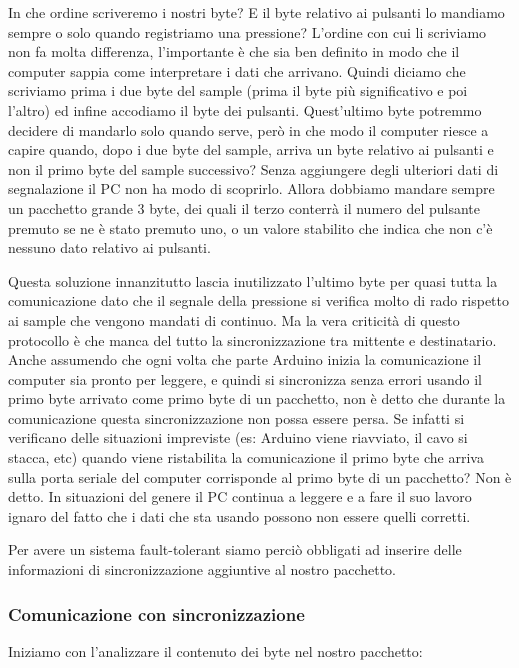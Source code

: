 \documentclass[a4paper,11pt]{article}
\begin{document}
In che ordine scriveremo i nostri byte? E il byte relativo ai pulsanti lo mandiamo sempre o solo quando registriamo una pressione? L'ordine con cui li scriviamo non fa molta differenza, l'importante è che sia ben definito in modo che il computer sappia come interpretare i dati che arrivano. Quindi diciamo che scriviamo prima i due byte del sample (prima il byte più significativo e poi l'altro) ed infine accodiamo il byte dei pulsanti.
Quest'ultimo byte potremmo decidere di mandarlo solo quando serve, però in che modo il computer riesce a capire quando, dopo i due byte del sample, arriva un byte relativo ai pulsanti e non il primo byte del sample successivo? Senza aggiungere degli ulteriori dati di segnalazione il PC non ha modo di scoprirlo. Allora dobbiamo mandare sempre un pacchetto grande 3 byte, dei quali il terzo conterrà il numero del pulsante premuto se ne è stato premuto uno, o un valore stabilito che indica che non c'è nessuno dato relativo ai pulsanti.
\vspace{0.2in}

Questa soluzione innanzitutto lascia inutilizzato l'ultimo byte per quasi tutta la comunicazione dato che il segnale della pressione si verifica molto di rado rispetto ai sample che vengono mandati di continuo. Ma la vera criticità di questo protocollo è che manca del tutto la sincronizzazione tra mittente e destinatario. Anche assumendo che ogni volta che parte Arduino inizia la comunicazione il computer sia pronto per leggere, e quindi si sincronizza senza errori usando il primo byte arrivato come primo byte di un pacchetto, non è detto che durante la comunicazione questa sincronizzazione non possa essere persa. Se infatti si verificano delle situazioni impreviste (es: Arduino viene riavviato, il cavo si stacca, etc) quando viene ristabilita la comunicazione il primo byte che arriva sulla porta seriale del computer corrisponde al primo byte di un pacchetto? Non è detto. In situazioni del genere il PC continua a leggere e a fare il suo lavoro ignaro del fatto che i dati che sta usando possono non essere quelli corretti.

Per avere un sistema fault-tolerant siamo perciò obbligati ad inserire delle informazioni di sincronizzazione aggiuntive al nostro pacchetto.

\subsubsection{Comunicazione con sincronizzazione}
Iniziamo con l'analizzare il contenuto dei byte nel nostro pacchetto:
\end{document}
